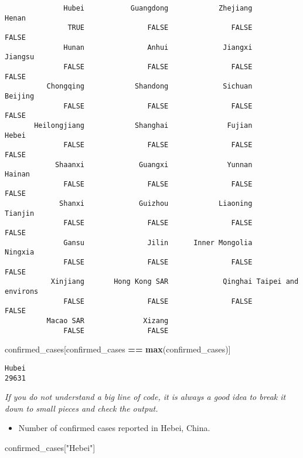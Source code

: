 \documentclass[]{article}
\newenvironment{Shaded}{\begin{snugshade}}{\end{snugshade}}
\newcommand{\KeywordTok}[1]{\textcolor[rgb]{0.13,0.29,0.53}{\textbf{#1}}}
\newcommand{\NormalTok}[1]{#1}
\newcommand{\OperatorTok}[1]{\textcolor[rgb]{0.81,0.36,0.00}{\textbf{#1}}}
\newcommand{\StringTok}[1]{\textcolor[rgb]{0.31,0.60,0.02}{#1}}
\providecommand{\tightlist}{%
  \setlength{\itemsep}{0pt}\setlength{\parskip}{0pt}}
\begin{document}
\begin{verbatim}
              Hubei           Guangdong            Zhejiang               Henan 
               TRUE               FALSE               FALSE               FALSE 
              Hunan               Anhui             Jiangxi             Jiangsu 
              FALSE               FALSE               FALSE               FALSE 
          Chongqing            Shandong             Sichuan             Beijing 
              FALSE               FALSE               FALSE               FALSE 
       Heilongjiang            Shanghai              Fujian               Hebei 
              FALSE               FALSE               FALSE               FALSE 
            Shaanxi             Guangxi              Yunnan              Hainan 
              FALSE               FALSE               FALSE               FALSE 
             Shanxi             Guizhou            Liaoning             Tianjin 
              FALSE               FALSE               FALSE               FALSE 
              Gansu               Jilin      Inner Mongolia             Ningxia 
              FALSE               FALSE               FALSE               FALSE 
           Xinjiang       Hong Kong SAR             Qinghai Taipei and environs 
              FALSE               FALSE               FALSE               FALSE 
          Macao SAR              Xizang 
              FALSE               FALSE 
\end{verbatim}

\begin{Shaded}
\begin{Highlighting}[]
\NormalTok{confirmed_cases[confirmed_cases }\OperatorTok{==}\StringTok{ }\KeywordTok{max}\NormalTok{(confirmed_cases)]}
\end{Highlighting}
\end{Shaded}

\begin{verbatim}
Hubei 
29631 
\end{verbatim}

\emph{If you do not understand a big line of code, it is always a good
idea to break it down to small pieces and check the output.}

\begin{itemize}
\tightlist
\item
  Number of confirmed cases reported in Hebei, China.
\end{itemize}

\begin{Shaded}
\begin{Highlighting}[]
\NormalTok{confirmed_cases[}\StringTok{"Hebei"}\NormalTok{]}
\end{Highlighting}
\end{Shaded}
\end{document}
